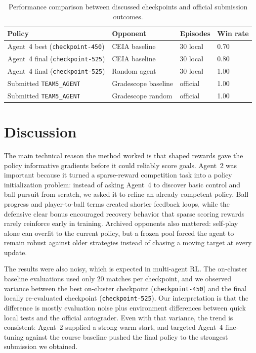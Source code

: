 \documentclass{article}
\begin{document}
\begin{table}[t]
\centering
\small
\caption{Performance comparison between discussed checkpoints and official submission outcomes.}
\label{tab:eval}
\begin{tabular}{llll}
\toprule
Policy & Opponent & Episodes & Win rate \\
\midrule
Agent~4 best (\texttt{checkpoint-450}) & CEIA baseline & 30 local & 0.70 \\
Agent~4 final (\texttt{checkpoint-525}) & CEIA baseline & 30 local & 0.80 \\
Agent~4 final (\texttt{checkpoint-525}) & Random agent & 30 local & 1.00 \\
Submitted \texttt{TEAM5\_AGENT} & Gradescope baseline & official & 1.00 \\
Submitted \texttt{TEAM5\_AGENT} & Gradescope random & official & 1.00 \\
\bottomrule
\end{tabular}
\end{table}

\section{Discussion}
The main technical reason the method worked is that shaped rewards gave the policy informative gradients before it could reliably score goals. Agent~2 was important because it turned a sparse-reward competition task into a policy initialization problem: instead of asking Agent~4 to discover basic control and ball pursuit from scratch, we asked it to refine an already competent policy. Ball progress and player-to-ball terms created shorter feedback loops, while the defensive clear bonus encouraged recovery behavior that sparse scoring rewards rarely reinforce early in training. Archived opponents also mattered: self-play alone can overfit to the current policy, but a frozen pool forced the agent to remain robust against older strategies instead of chasing a moving target at every update.

The results were also noisy, which is expected in multi-agent RL. The on-cluster baseline evaluations used only 20 matches per checkpoint, and we observed variance between the best on-cluster checkpoint (\texttt{checkpoint-450}) and the final locally re-evaluated checkpoint (\texttt{checkpoint-525}). Our interpretation is that the difference is mostly evaluation noise plus environment differences between quick local tests and the official autograder. Even with that variance, the trend is consistent: Agent~2 supplied a strong warm start, and targeted Agent~4 fine-tuning against the course baseline pushed the final policy to the strongest submission we obtained.
\end{document}
